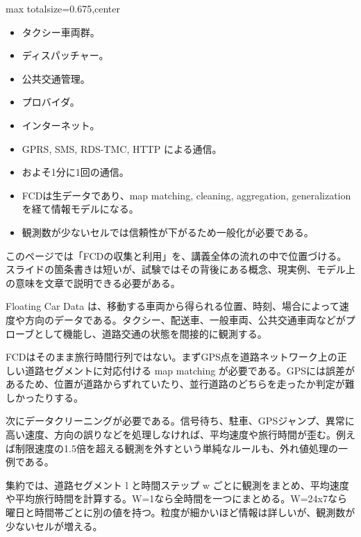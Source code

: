 \clearpage
{}
\begin{adjustbox}{max totalsize={\textwidth}{0.675\textheight},center}
\begin{minipage}{\textwidth}\scriptsize
\begin{minipage}[t]{0.485\textwidth}
\begin{itemize}
\item タクシー車両群。
\item ディスパッチャー。
\item 公共交通管理。
\item プロバイダ。
\item インターネット。
\item GPRS, SMS, RDS-TMC, HTTP による通信。
\item およそ1分に1回の通信。
\end{itemize}
\begin{itemize}
\item FCDは生データであり、map matching, cleaning, aggregation, generalization を経て情報モデルになる。
\item 観測数が少ないセルでは信頼性が下がるため一般化が必要である。
\end{itemize}
\end{minipage}\hfill
\begin{minipage}[t]{0.485\textwidth}
このページでは「FCDの収集と利用」を、講義全体の流れの中で位置づける。スライドの箇条書きは短いが、試験ではその背後にある概念、現実例、モデル上の意味を文章で説明できる必要がある。\par
Floating Car Data は、移動する車両から得られる位置、時刻、場合によって速度や方向のデータである。タクシー、配送車、一般車両、公共交通車両などがプローブとして機能し、道路交通の状態を間接的に観測する。\par
FCDはそのまま旅行時間行列ではない。まずGPS点を道路ネットワーク上の正しい道路セグメントに対応付ける map matching が必要である。GPSには誤差があるため、位置が道路からずれていたり、並行道路のどちらを走ったか判定が難しかったりする。\par
次にデータクリーニングが必要である。信号待ち、駐車、GPSジャンプ、異常に高い速度、方向の誤りなどを処理しなければ、平均速度や旅行時間が歪む。例えば制限速度の1.5倍を超える観測を外すという単純なルールも、外れ値処理の一例である。\par
集約では、道路セグメント l と時間ステップ w ごとに観測をまとめ、平均速度や平均旅行時間を計算する。W=1なら全時間を一つにまとめる。W=24x7なら曜日と時間帯ごとに別の値を持つ。粒度が細かいほど情報は詳しいが、観測数が少ないセルが増える。\par

\end{minipage}
\end{minipage}
\end{adjustbox}
